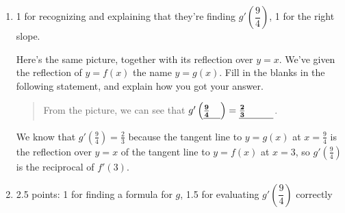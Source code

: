 \documentclass{article}
\begin{document}
\begin{enumerate}
\begin{enumerate}
  \item \label{tangent-line-reflection}

    \begin{grading}
      1 for recognizing and explaining that they're finding $g' \left( \dfrac{9}{4} \right)$, 1 for the right slope. 
    \end{grading}

    \begin{problem}[0.25in]
      Here's the same picture, together with its reflection over $y = x$. We've given the reflection of $y = f(x)$ the name $y = g(x)$. Fill in the blanks in the following statement, and explain how you got your answer.
      \begin{quote}
        From the picture, we can see that 
        $g' \left( \fitb{0.25in}{\frac{9}{4}} \right) = \fitb{0.5in}{\frac{2}{3}}$.
      \end{quote}


      \begin{solution}
        We know that $g'(\frac{9}{4})=\frac{2}{3}$ because the tangent line
        to $y=g(x)$ at $x=\frac{9}{4}$ is the reflection over $y=x$ of
        the tangent line to $y=f(x)$ at $x=3$, so $g'(\frac{9}{4})$ is the
        reciprocal of $f'(3)$.
      \end{solution}

    \end{problem}

  \item

    \begin{grading}
      2.5 points: 1 for finding a formula for $g$, 1.5 for evaluating $g' \left( \dfrac{9}{4} \right)$ correctly
    \end{grading}


\end{enumerate}
\end{enumerate}
\end{document}
